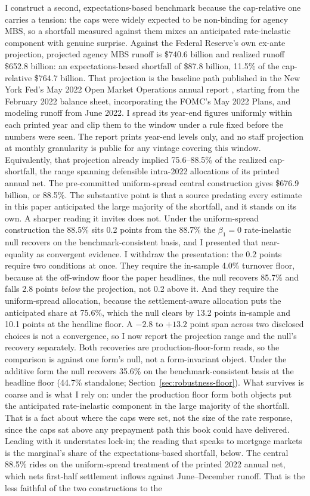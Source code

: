 \documentclass[12pt]{article}
\begin{document}
I construct a second, expectations-based benchmark because the cap-relative one carries a tension: the caps were widely expected to be non-binding for agency MBS, so a shortfall measured against them mixes an anticipated rate-inelastic component with genuine surprise. Against the Federal Reserve's own ex-ante projection, projected agency MBS runoff is \$740.6 billion and realized runoff \$652.8 billion: an expectations-based shortfall of \$87.8 billion, 11.5\% of the cap-relative \$764.7 billion. That projection is the baseline path published in the New York Fed's May 2022 Open Market Operations annual report \citep{omo2021}, starting from the February 2022 balance sheet, incorporating the FOMC's May 2022 Plans, and modeling runoff from June 2022. I spread its year-end figures uniformly within each printed year and clip them to the window under a rule fixed before the numbers were seen. The report prints year-end levels only, and no staff projection at monthly granularity is public for any vintage covering this window. Equivalently, that projection already implied 75.6--88.5\% of the realized cap-shortfall, the range spanning defensible intra-2022 allocations of its printed annual net. The pre-committed uniform-spread central construction gives \$676.9 billion, or 88.5\%. The substantive point is that a source predating every estimate in this paper anticipated the large majority of the shortfall, and it stands on its own. A sharper reading it invites does not. Under the uniform-spread construction the 88.5\% sits 0.2 points from the 88.7\% the $\beta_1 = 0$ rate-inelastic null recovers on the benchmark-consistent basis, and I presented that near-equality as convergent evidence. I withdraw the presentation: the 0.2 points require two conditions at once. They require the in-sample 4.0\% turnover floor, because at the off-window floor the paper headlines, the null recovers 85.7\% and falls 2.8 points \emph{below} the projection, not 0.2 above it. And they require the uniform-spread allocation, because the settlement-aware allocation puts the anticipated share at 75.6\%, which the null clears by 13.2 points in-sample and 10.1 points at the headline floor. A $-2.8$ to $+13.2$ point span across two disclosed choices is not a convergence, so I now report the projection range and the null's recovery separately. Both recoveries are production-floor-form reads, so the comparison is against one form's null, not a form-invariant object. Under the additive form the null recovers 35.6\% on the benchmark-consistent basis at the headline floor (44.7\% standalone; Section~\ref{sec:robustness-floor}). What survives is coarse and is what I rely on: under the production floor form both objects put the anticipated rate-inelastic component in the large majority of the shortfall. That is a fact about where the caps were set, not the size of the rate response, since the caps sat above any prepayment path this book could have delivered. Leading with it understates lock-in; the reading that speaks to mortgage markets is the marginal's share of the expectations-based shortfall, below. The central 88.5\% rides on the uniform-spread treatment of the printed 2022 annual net, which nets first-half settlement inflows against June--December runoff. That is the less faithful of the two constructions to the 
\end{document}
